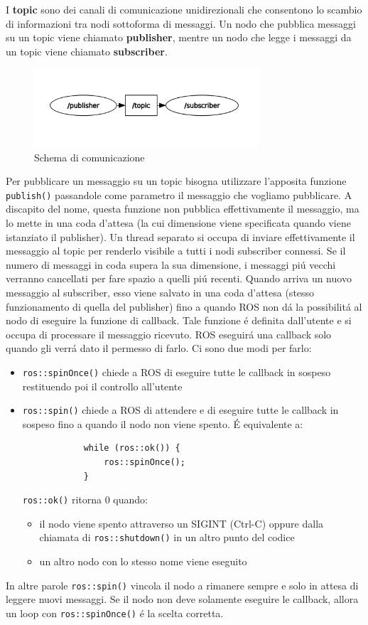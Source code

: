I \textbf{topic} sono dei canali di comunicazione unidirezionali che consentono lo scambio di informazioni tra nodi sottoforma di 
messaggi. Un nodo che pubblica messaggi su un topic viene chiamato \textbf{publisher}, mentre un nodo che legge i messaggi da un topic 
viene chiamato \textbf{subscriber}.
\begin{figure}[H]
    \centering
    \includegraphics*[width=0.75\textwidth]{images/topic_graph.png}
    \caption{Schema di comunicazione}
    \label{fig:topic_graph}
\end{figure}
Per pubblicare un messaggio su un topic bisogna utilizzare l'apposita funzione \verb|publish()| passandole come parametro 
il messaggio che vogliamo pubblicare.
A discapito del nome, questa funzione non pubblica effettivamente il messaggio, ma lo mette in una coda d'attesa (la cui 
dimensione viene specificata quando viene istanziato il publisher).
Un thread separato si occupa di inviare effettivamente il messaggio al topic per renderlo visibile a tutti i nodi subscriber 
connessi.
Se il numero di messaggi in coda supera la sua dimensione, i messaggi pi\'{u} vecchi verranno cancellati per fare spazio 
a quelli pi\'{u} recenti. Quando arriva un nuovo messaggio al subscriber, esso viene salvato 
in una coda d'attesa (stesso funzionamento di quella del publisher) fino a quando ROS non d\'{a} la possibilit\'{a} al nodo 
di eseguire la funzione di callback. Tale funzione \'{e} definita dall'utente e si occupa di processare il messaggio ricevuto. 
ROS eseguir\'{a} una callback solo quando gli verr\'{a} dato il permesso di farlo. Ci sono due modi per farlo:
\begin{itemize}
    \item \verb|ros::spinOnce()| chiede a ROS di eseguire tutte le callback in sospeso restituendo poi il controllo all'utente
    \item \verb|ros::spin()| chiede a ROS di attendere e di eseguire tutte le callback in sospeso fino a quando il nodo non 
          viene spento. \'{E} equivalente a:
          \begin{verbatim}
            while (ros::ok()) {
                ros::spinOnce();
            }
          \end{verbatim} 
          \verb|ros::ok()| ritorna 0 quando: 
          \begin{itemize}
            \item il nodo viene spento attraverso un SIGINT (Ctrl-C) oppure dalla chiamata di \verb|ros::shutdown()| in 
                  un altro punto del codice
            \item un altro nodo con lo stesso nome viene eseguito
          \end{itemize}
\end{itemize}
In altre parole \verb|ros::spin()| vincola il nodo a rimanere sempre e solo in attesa di leggere nuovi messaggi. 
Se il nodo non deve solamente eseguire le callback, allora un loop con \verb|ros::spinOnce()| \'{e} la scelta corretta. 
